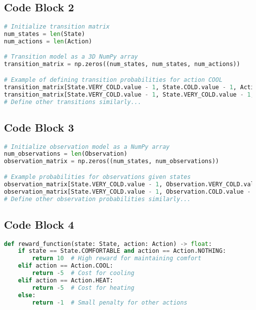 \documentclass[11pt,a4paper]{article}
\begin{document}
\subsection{Code Block 2}

\begin{lstlisting}[language=Python, caption={Implementation code for the POMDP with Active Inference}]
# Initialize transition matrix
num_states = len(State)
num_actions = len(Action)

# Transition model as a 3D NumPy array
transition_matrix = np.zeros((num_states, num_states, num_actions))

# Example of defining transition probabilities for action COOL
transition_matrix[State.VERY_COLD.value - 1, State.COLD.value - 1, Action.COOL.value - 1] = 0.8
transition_matrix[State.VERY_COLD.value - 1, State.VERY_COLD.value - 1, Action.COOL.value - 1] = 0.2
# Define other transitions similarly...
\end{lstlisting}


\subsection{Code Block 3}

\begin{lstlisting}[language=Python, caption={Implementation code for the POMDP with Active Inference}]
# Initialize observation model as a NumPy array
num_observations = len(Observation)
observation_matrix = np.zeros((num_states, num_observations))

# Example probabilities for observations given states
observation_matrix[State.VERY_COLD.value - 1, Observation.VERY_COLD.value - 1] = 0.9
observation_matrix[State.VERY_COLD.value - 1, Observation.COLD.value - 1] = 0.1
# Define other observation probabilities similarly...
\end{lstlisting}


\subsection{Code Block 4}

\begin{lstlisting}[language=Python, caption={Implementation code for the POMDP with Active Inference}]
def reward_function(state: State, action: Action) -> float:
    if state == State.COMFORTABLE and action == Action.NOTHING:
        return 10  # High reward for maintaining comfort
    elif action == Action.COOL:
        return -5  # Cost for cooling
    elif action == Action.HEAT:
        return -5  # Cost for heating
    else:
        return -1  # Small penalty for other actions
\end{lstlisting}
\end{document}
